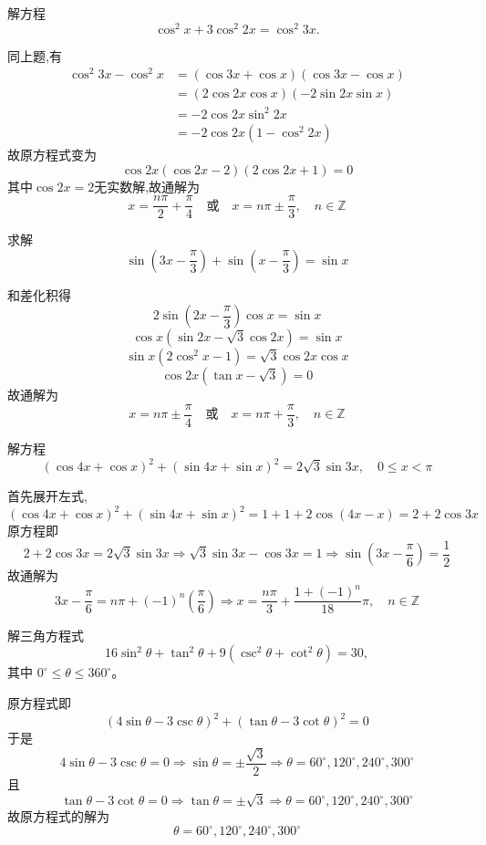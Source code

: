 \begin{questions}
    \question 解方程 
    \[
    \cos^2 x + 3 \cos^2 2x = \cos^2 3x.
    \]
    \begin{solution}
        同上题,有
        \begin{align*}
        \cos^2 3x - \cos^2 x 
        &= (\cos 3x + \cos x)(\cos 3x - \cos x) \\
        &= (2 \cos 2x \cos x)(-2 \sin 2x \sin x) \\
        &= -2 \cos 2x \sin^2 2x \\
        &= -2 \cos 2x (1-\cos^2 2x)
        \end{align*}
        故原方程式变为
        \[
        \cos 2x (\cos 2x-2)(2\cos 2x+1) =0
        \]
        其中$\cos 2x=2$无实数解,故通解为
        \[
        x = \frac{n\pi}{2} + \frac{\pi}{4} \quad \text{或} \quad x = n\pi \pm \frac{\pi}{3},\quad n \in \mathbb{Z}
        \]
    \end{solution}
    
    \question 求解
    \[
    \sin\left(3x-\frac{\pi}{3}\right)+\sin\left(x-\frac{\pi}{3}\right)=\sin x
    \]
    \begin{solution}
        和差化积得
        \[
        2\sin\left(2x-\frac{\pi}{3}\right)\cos x=\sin x 
        \]
        \[
        \cos x (\sin2x-\sqrt3\cos2x)=\sin x
        \]
        \[ 
        \sin x(2\cos^2 x-1)=\sqrt{3}\cos 2x\cos x 
        \]
        \[
        \cos2x(\tan x-\sqrt3)=0
        \]
        故通解为
        \[
        x=n\pi \pm \frac{\pi}{4} \quad \text{或} \quad x=n\pi+\frac{\pi}{3}, \quad n\in\mathbb{Z}
        \]
    \end{solution}

    \question 解方程
    \[
    (\cos 4x + \cos x)^2 + (\sin 4x + \sin x)^2 = 2\sqrt{3}\sin 3x, \quad 0 \le x < \pi
    \]
    \begin{solution}
        首先展开左式,
        \[
        (\cos 4x+\cos x)^2+(\sin 4x+\sin x)^2 = 1 + 1 + 2\cos(4x-x) = 2 + 2\cos 3x
        \]
        原方程即
        \[
        2 + 2\cos 3x = 2\sqrt{3}\sin 3x \Rightarrow \sqrt{3}\sin 3x - \cos 3x = 1 \Rightarrow \sin\left(3x-\frac{\pi}{6}\right) = \frac{1}{2}
        \]
        故通解为
        \[
        3x - \frac{\pi}{6} = n\pi + (-1)^n\left(\frac{\pi}{6}\right) \Rightarrow x= \frac{n\pi}{3} + \frac{1+(-1)^n}{18}\pi, \quad n \in \mathbb{Z}
        \]
    \end{solution}

    \question 解三角方程式 
    \[
    16\sin^{2}\theta + \tan^{2}\theta + 9(\csc^{2}\theta + \cot^{2}\theta) = 30, 
    \]
    其中 $0^\circ \leq \theta \leq 360^\circ$。
    \begin{solution}
        原方程式即
        \[
        (4 \sin\theta - 3 \csc\theta)^2 + (\tan\theta - 3 \cot\theta)^2 = 0
        \]
        于是
        \[
        4 \sin\theta - 3 \csc\theta = 0 \Rightarrow \sin\theta = \pm\frac{\sqrt{3}}{2} \Rightarrow \theta =60^\circ, 120^\circ, 240^\circ, 300^\circ
        \]
        且
        \[
        \tan\theta - 3 \cot\theta = 0 \Rightarrow \tan\theta = \pm\sqrt{3} \Rightarrow \theta = 60^\circ, 120^\circ, 240^\circ, 300^\circ
        \]
        故原方程式的解为
        \[
        \theta = 60^\circ, 120^\circ, 240^\circ, 300^\circ
        \]
    \end{solution}


\end{questions}
